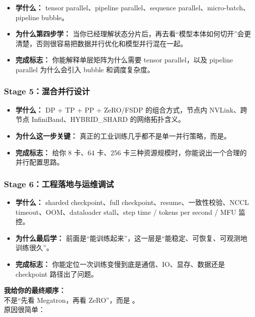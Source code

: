 \begin{itemize}[leftmargin=1.5em]
  \item \textbf{学什么：} tensor parallel、pipeline parallel、sequence parallel、micro-batch、pipeline bubble。
  \item \textbf{为什么第四步学：} 当你已经理解状态分片后，再去看“模型本体如何切开”会更清楚，否则很容易把数据并行优化和模型并行混在一起。
  \item \textbf{完成标志：} 你能解释单层矩阵为什么需要 tensor parallel，以及 pipeline parallel 为什么会引入 bubble 和调度复杂度。
\end{itemize}

\subsubsection*{Stage 5：混合并行设计}

\begin{itemize}[leftmargin=1.5em]
  \item \textbf{学什么：} DP + TP + PP + ZeRO/FSDP 的组合方式，节点内 NVLink、跨节点 InfiniBand、HYBRID\_SHARD 的网络拓扑含义。
  \item \textbf{为什么这一步关键：} 真正的工业训练几乎都不是单一并行策略，而是。
  \item \textbf{完成标志：} 给你 8 卡、64 卡、256 卡三种资源规模时，你能说出一个合理的并行配置思路。
\end{itemize}

\subsubsection*{Stage 6：工程落地与运维调试}

\begin{itemize}[leftmargin=1.5em]
  \item \textbf{学什么：} sharded checkpoint、full checkpoint、resume、一致性校验、NCCL timeout、OOM、dataloader stall、step time / tokens per second / MFU 监控。
  \item \textbf{为什么最后学：} 前面是“能训练起来”，这一层是“能稳定、可恢复、可观测地训练很久”。
  \item \textbf{完成标志：} 你能定位一次训练变慢到底是通信、IO、显存、数据还是 checkpoint 路径出了问题。
\end{itemize}

\begin{summarybox}
\textbf{我给你的最终顺序：}\\
不是“先看 Megatron，再看 ZeRO”，而是 。\\
原因很简单：
\end{summarybox}

